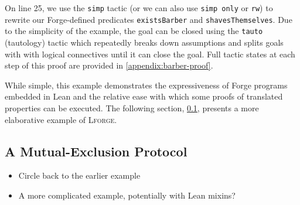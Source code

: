 On line 25, we use the \texttt{simp} tactic (or we can also use \texttt{simp only} or \texttt{rw}) to rewrite our Forge-defined predicates \texttt{existsBarber} and \texttt{shavesThemselves}. Due to the simplicity of the example, the goal can be closed using the \texttt{tauto} (tautology) tactic which repeatedly breaks down assumptions and splits goals with with logical connectives until it can close the goal. Full tactic states at each step of this proof are provided in \cref{appendix:barber-proof}. 

While simple, this example demonstrates the expressiveness of Forge programs embedded in Lean and the relative ease with which some proofs of translated properties can be executed. The following section, \cref{sec:mutex}, presents a more elaborative example of \textsc{Lforge}.

\subsection{A Mutual-Exclusion Protocol}\label{sec:mutex}

\begin{itemize}
  \item Circle back to the earlier example
  \item A more complicated example, potentially with Lean mixins?
\end{itemize}
